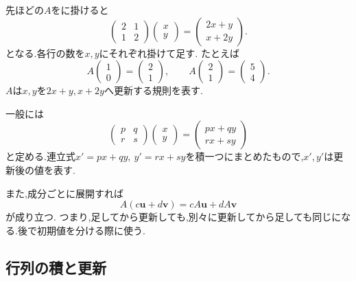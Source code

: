 先ほどの$A$をに掛けると
\[
  \begin{pmatrix}2&1\\1&2\end{pmatrix}
  \begin{pmatrix}x\\y\end{pmatrix}
  =
  \begin{pmatrix}2x+y\\x+2y\end{pmatrix}.
\]
となる.各行の数を$x,y$にそれぞれ掛けて足す.
たとえば
\[
  A\begin{pmatrix}1\\0\end{pmatrix}
  =\begin{pmatrix}2\\1\end{pmatrix},
  \qquad
  A\begin{pmatrix}2\\1\end{pmatrix}
  =\begin{pmatrix}5\\4\end{pmatrix}.
\]
$A$は$x,y$を$2x+y,x+2y$へ更新する規則を表す.
  \BookFigMatrixMap

一般には
\[
  \begin{pmatrix}p&q\\r&s\end{pmatrix}
  \begin{pmatrix}x\\y\end{pmatrix}
  =\begin{pmatrix}px+qy\\rx+sy\end{pmatrix}
\]
と定める.連立式$x'=px+qy,\ y'=rx+sy$を積一つにまとめたもので,$x',y'$は更新後の値を表す.

また,成分ごとに展開すれば
\[
  A(c\boldsymbol{u}+d\boldsymbol{v})
  =cA\boldsymbol{u}+dA\boldsymbol{v}
\]
が成り立つ.
つまり,足してから更新しても,別々に更新してから足しても同じになる.後で初期値を分ける際に使う.

\subsection{行列の積と更新}


